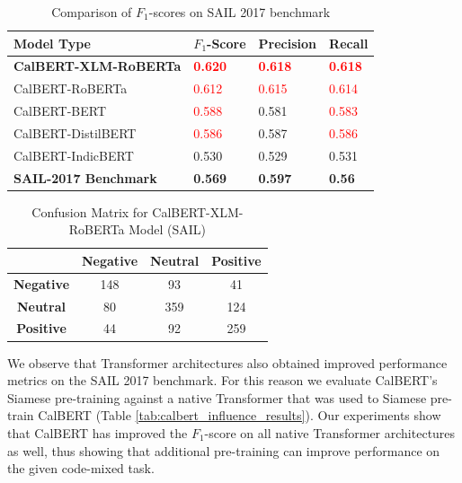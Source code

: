 \documentclass[conference]{IEEEtran}
\begin{document}
\begin{table}[htbp]
\centering
\caption{Comparison of $F_1$-scores on SAIL 2017 benchmark}
\label{tab:results_calbert}
\begin{tabular}{|p{}|p{}|p{}|p{}|}
\hline
\textbf{Model Type} & \textbf{$F_1$-Score} & \textbf{Precision} & \textbf{Recall}\\ 
\hline
\textbf{CalBERT-XLM-RoBERTa} & \textbf{\textcolor{red}{0.620}} & \textcolor{red}{\textbf{0.618}} & \textcolor{red}{\textbf{0.618}} \\ 
\hline
CalBERT-RoBERTa & \textcolor{red}{0.612} & \textcolor{red}{0.615} & \textcolor{red}{0.614} \\
\hline
CalBERT-BERT & \textcolor{red}{0.588} & 0.581 & \textcolor{red}{0.583}  \\ 
\hline
CalBERT-DistilBERT  & \textcolor{red}{0.586} & 0.587 & \textcolor{red}{0.586} \\
\hline
CalBERT-IndicBERT & 0.530 & 0.529 & 0.531 \\
\hline
\textbf{SAIL-2017   Benchmark} & \textbf{0.569}  & \textbf{0.597} & \textbf{0.56} \\ \hline
\end{tabular}
\end{table}

\begin{table}[!h]
    \centering
    \caption{Confusion Matrix for CalBERT-XLM-RoBERTa Model (SAIL)}
    \label{tab:confusion_matrix}
    \begin{tabular}{|c|c|c|c|}
    \hline
        & \textbf{Negative} & \textbf{Neutral} & \textbf{Positive} \\
    \hline
        \textbf{Negative} & 148 & 93 & 41 \\
    \hline
        \textbf{Neutral} & 80 & 359 & 124 \\
    \hline
        \textbf{Positive} & 44 & 92 & 259 \\
    \hline
    \end{tabular}
    
\end{table}

We observe that Transformer architectures also obtained improved performance metrics on the SAIL 2017 benchmark. For this reason we evaluate CalBERT's Siamese pre-training against a native Transformer that was used to Siamese pre-train CalBERT (Table \ref{tab:calbert_influence_results}). Our experiments show that CalBERT has improved the $F_1$-score on all native Transformer architectures as well, thus showing that additional pre-training can improve performance on the given code-mixed task. 
\end{document}
